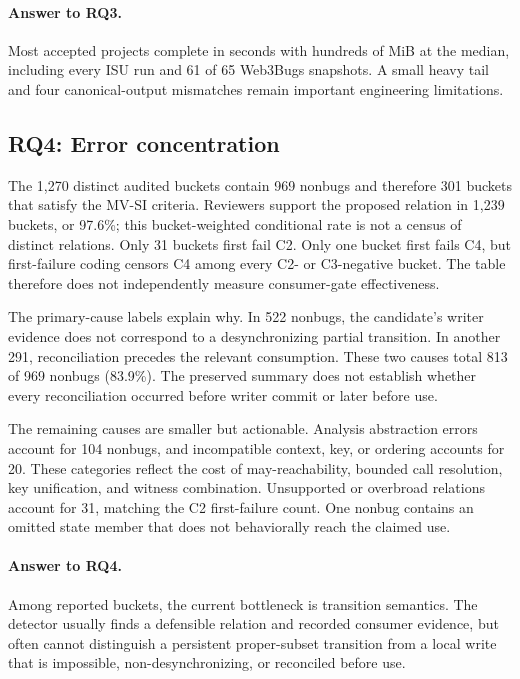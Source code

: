 \paragraph{Answer to RQ3.}
Most accepted projects complete in seconds with hundreds of MiB at the median, including every ISU run and 61 of 65 Web3Bugs snapshots. A small heavy tail and four canonical-output mismatches remain important engineering limitations.

\subsection{RQ4: Error concentration}
\label{s:results-errors}



The 1,270 distinct audited buckets contain 969 nonbugs and therefore 301 buckets that satisfy the MV-SI criteria. Reviewers support the proposed relation in 1,239 buckets, or 97.6\%; this bucket-weighted conditional rate is not a census of distinct relations. Only 31 buckets first fail C2. Only one bucket first fails C4, but first-failure coding censors C4 among every C2- or C3-negative bucket. The table therefore does not independently measure consumer-gate effectiveness.

The primary-cause labels explain why. In 522 nonbugs, the candidate's writer evidence does not correspond to a desynchronizing partial transition. In another 291, reconciliation precedes the relevant consumption. These two causes total 813 of 969 nonbugs (83.9\%). The preserved summary does not establish whether every reconciliation occurred before writer commit or later before use.

The remaining causes are smaller but actionable. Analysis abstraction errors account for 104 nonbugs, and incompatible context, key, or ordering accounts for 20. These categories reflect the cost of may-reachability, bounded call resolution, key unification, and witness combination. Unsupported or overbroad relations account for 31, matching the C2 first-failure count. One nonbug contains an omitted state member that does not behaviorally reach the claimed use.

\paragraph{Answer to RQ4.}
Among reported buckets, the current bottleneck is transition semantics. The detector usually finds a defensible relation and recorded consumer evidence, but often cannot distinguish a persistent proper-subset transition from a local write that is impossible, non-desynchronizing, or reconciled before use.

